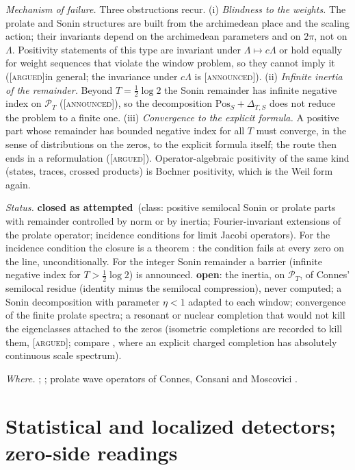 \documentclass[11pt]{amsart}
\theoremstyle{definition}
\theoremstyle{remark}
\numberwithin{equation}{section}
\newcommand{\PT}{\mathcal{P}_T}                        %
\newcommand{\stag}[1]{\textsc{[#1]}}
\newcommand{\ARGUED}{\stag{argued}}
\newcommand{\ANNOUNCED}{\stag{announced}}
\newcommand{\rtag}[1]{\textbf{\small\textsf{#1}}}
\newcommand{\closedA}{\rtag{closed as attempted}}
\newcommand{\openR}{\rtag{open}}
\newcommand{\entry}[1]{\par\smallskip\noindent\textit{#1.}\enspace}
\begin{document}
\entry{Mechanism of failure} Three obstructions recur.
(i) \emph{Blindness to the weights.} The prolate and Sonin structures are built from the
archimedean place and the scaling action; their invariants depend on the archimedean parameters
and on $2\pi$, not on $\Lambda$. Positivity statements of this type are invariant under
$\Lambda\mapsto c\Lambda$ or hold equally for weight sequences that violate the window problem, so
they cannot imply it (\ARGUED in general; the invariance under $c\Lambda$ is \ANNOUNCED).
(ii) \emph{Infinite inertia of the remainder.} Beyond $T=\frac12\log2$ the Sonin remainder has
infinite negative index on $\PT$ (\ANNOUNCED), so the decomposition $\mathrm{Pos}_S+\Delta_{T,S}$
does not reduce the problem to a finite one.
(iii) \emph{Convergence to the explicit formula.} A positive part whose remainder has bounded
negative index for all $T$ must converge, in the sense of distributions on the zeros, to the
explicit formula itself; the route then ends in a reformulation (\ARGUED). Operator-algebraic
positivity of the same kind (states, traces, crossed products) is Bochner positivity, which is the
Weil form again.

\entry{Status} \closedA\ (class: positive semilocal Sonin or prolate parts with remainder controlled
by norm or by inertia; Fourier-invariant extensions of the prolate operator; incidence conditions
for limit Jacobi operators). For the incidence condition the closure is a theorem
\cite[Proposition~3.3]{P23}: the condition fails at every zero on the line, unconditionally. For
the integer Sonin remainder a barrier (infinite negative index for $T>\frac12\log2$) is announced.
\openR: the inertia, on $\PT$, of Connes' semilocal residue (identity minus the semilocal
compression), never computed; a Sonin decomposition with parameter $\eta<1$ adapted to each window;
convergence of the finite prolate spectra; a resonant or nuclear completion that would not kill the
eigenclasses attached to the zeros (isometric completions are recorded to kill them, \ARGUED;
compare \cite[Theorem~10.7]{P40}, where an explicit charged completion has absolutely continuous
scale spectrum).

\entry{Where} \cite{P22,P23,P39,P40,P41}; \cite{Connes1999,ConnesConsani2021,SlepianPollak1961,
LandauWidom1980}; prolate wave operators of Connes, Consani and Moscovici \cite{CCM2024}.


\section{Statistical and localized detectors; zero-side readings}\label{w6:sec:detectors}
\end{document}
